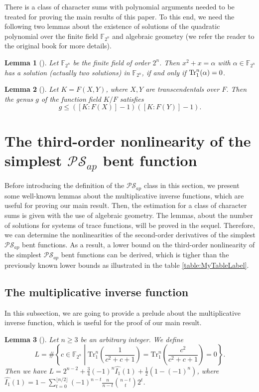\documentclass{article}
\newcommand{\F}{\mathbb{F}}
\newcommand{\0}{\textbf{0}}
\newcommand{\1}{\textbf{1}}
\theoremstyle{plain}
\newtheorem{lemma}{Lemma}
\begin{document}
    There is a class of character sums with polynomial arguments needed to be treated for proving the main results of this paper.   
    To this end, we need the following two lemmas about the existence of solutions of the quadratic polynomial over the finite field $\F_{2^n}$ and algebraic geometry (we refer the reader to the original book for more details). 
    \begin{lemma}[\cite{Lidl1997FiniteFieldBook}]\label{lemma:hilbert90}
        Let $\F_{2^n}$ be the finite field of order $2^n$. 
        Then $x^2+x=\alpha$ with $\alpha\in\F_{2^n}$ has a solution (actually two solutions) in $\F_{2^n}$, if and only if $\Tr_1^n(\alpha)=0$. 
    \end{lemma}
    \begin{lemma}[\cite{Stichtenoth2008book_algebraicfunctionfieldsandcodes}]\label{L:genus_K_F}
        Let $K=F(X,Y)$, where $X,Y$ are transcendentals over $F$. 
        Then the genus $g$ of the function field $K/F$ satisfies 
        \[g\le ([K : F(X)] - 1)([K : F(Y)] - 1).\]
    \end{lemma}
\section{The third-order nonlinearity of the simplest $\mathcal{PS}_{ap}$ bent function}
    Before introducing the definition of the $\mathcal{PS}_{ap}$ class in this section, we present some well-known lemmas about the multiplicative inverse functions, which are useful for proving our main result. 
    Then, the estimation for a class of character sums is given with the use of algebraic geometry. 
    The lemmas, about the number of solutions for systems of trace functions, will be proved in the sequel. 
    Therefore, we can determine the nonlinearities of the second-order derivatives of the simplest $\mathcal{PS}_{ap}$ bent functions. 
    As a result, a lower bound on the third-order nonlinearity of the simplest $\mathcal{PS}_{ap}$ bent functions can be derived, which is tigher than the previously known lower bounds as illustrated in the table \ref{table:MyTableLabel}.
    \subsection{The multiplicative inverse function}
    In this subsection, we are going to provide a prelude about the multiplicative inverse function, which is useful for the proof of our main result. 
    \begin{lemma}[\cite{tang2022invfunc}]\label{L:SumInv00}
        Let $n\geq 3$ be an arbitrary integer. 
        We define
        $$L=\#\left\{c\in\F_{2^n} \middle| \mathrm{Tr}_1^n\left(\frac{1}{c^2+c+1}\right)=\mathrm{Tr}_1^n\left(\frac{c^2}{c^2+c+1}\right)=0\right\}.$$
        Then we have $L=2^{n-2}+\frac{3}{4}(-1)^n\widehat{I_1}(1)+\frac{1}{2}\left(1-(-1)^n\right)$, where $\widehat{I_1}(1)=1-\sum_{t=0}^{\lfloor n/2\rfloor}(-1)^{n-t}\frac{n}{n-t}{{n-t}\choose {t}}2^t$.
    \end{lemma}
\end{document}
